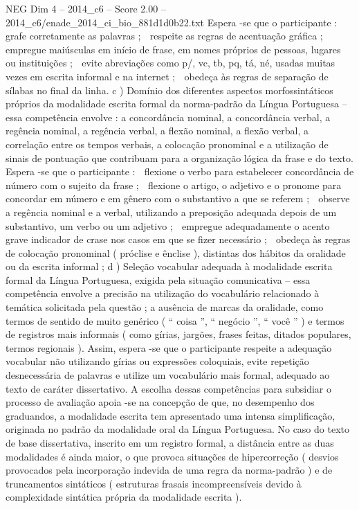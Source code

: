\begin{textsample}{NEG Dim 4 – 2014\_c6 – Score 2.00 – 2014\_c6/enade\_2014\_ci\_bio\_881d1d0b22.txt}
Espera -se que o participante :  grafe corretamente as palavras ;  respeite as regras de acentuação gráfica ;  empregue maiúsculas em início de frase, em nomes próprios de pessoas, lugares ou instituições ;  evite abreviações como p/, vc, tb, pq, tá, né, usadas muitas vezes em escrita informal e na internet ;  obedeça às regras de separação de sílabas no final da linha. c ) Domínio dos diferentes aspectos morfossintáticos próprios da modalidade escrita formal da norma-padrão da Língua Portuguesa – essa competência envolve : a concordância nominal, a concordância verbal, a regência nominal, a regência verbal, a flexão nominal, a flexão verbal, a correlação entre os tempos verbais, a colocação pronominal e a utilização de sinais de pontuação que contribuam para a organização lógica da frase e do texto.
Espera -se que o participante :  flexione o verbo para estabelecer concordância de número com o sujeito da frase ;  flexione o artigo, o adjetivo e o pronome para concordar em número e em gênero com o substantivo a que se referem ;  observe a regência nominal e a verbal, utilizando a preposição adequada depois de um substantivo, um verbo ou um adjetivo ;  empregue adequadamente o acento grave indicador de crase nos casos em que se fizer necessário ;  obedeça às regras de colocação pronominal ( próclise e ênclise ), distintas dos hábitos da oralidade ou da escrita informal ; d ) Seleção vocabular adequada à modalidade escrita formal da Língua Portuguesa, exigida pela situação comunicativa – essa competência envolve a precisão na utilização do vocabulário relacionado à temática solicitada pela questão ; a ausência de marcas da oralidade, como termos de sentido de muito genérico ( “ coisa ”, “ negócio ”, “ você ” ) e termos de registros mais informais ( como gírias, jargões, frases feitas, ditados populares, termos regionais ).
Assim, espera -se que o participante respeite a adequação vocabular não utilizando gírias ou expressões coloquiais, evite repetição desnecessária de palavras e utilize um vocabulário mais formal, adequado ao texto de caráter dissertativo.
A escolha dessas competências para subsidiar o processo de avaliação apoia -se na concepção de que, no desempenho dos graduandos, a modalidade escrita tem apresentado uma intensa simplificação, originada no padrão da modalidade oral da Língua Portuguesa.
No caso do texto de base dissertativa, inscrito em um registro formal, a distância entre as duas modalidades é ainda maior, o que provoca situações de hipercorreção ( desvios provocados pela incorporação indevida de uma regra da norma-padrão ) e de truncamentos sintáticos ( estruturas frasais incompreensíveis devido à complexidade sintática própria da modalidade escrita ).

\end{textsample}
